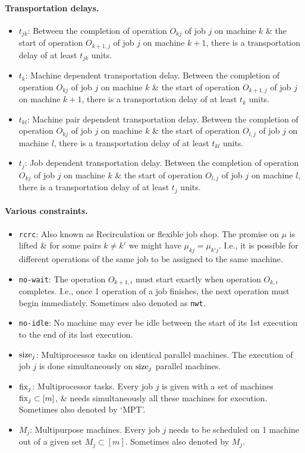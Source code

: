 \documentclass{article}
\begin{document}
\paragraph{Transportation delays.}

\begin{itemize}
	\item $t_{jk}$: Between the completion of operation $O_{kj}$ of job $j$ on machine $k$ \& the start of operation $O_{k+1,j}$ of job $j$ on machine $k + 1$, there is a transportation delay of at least $t_{jk}$ units.
	\item $t_k$: Machine dependent transportation delay. Between the completion of operation $O_{kj}$ of job $j$ on machine $k$ \& the start of operation $O_{k+1,j}$ of job $j$ on machine $k + 1$, there is a transportation delay of at least $t_k$ units.
	\item $t_{kl}$: Machine pair dependent transportation delay. Between the completion of operation $O_{kj}$ of job $j$ on machine $k$ \& the start of operation $O_{l,j}$ of job $j$ on machine $l$, there is a transportation delay of at least $t_{kl}$ units.
	\item $t_j$: Job dependent transportation delay. Between the completion of operation $O_{kj}$ of job $j$ on machine $k$ \& the start of operation $O_{l,j}$ of job $j$ on machine $l$, there is a transportation delay of at least $t_j$ units.
\end{itemize}

\paragraph{Various constraints.}

\begin{itemize}
	\item {\tt rcrc}: Also known as Recirculation or flexible job shop. The promise on $\mu$ is lifted \& for some pairs $k\ne k'$ we might have $\mu_{kj} = \mu_{k'j}$. I.e., it is possible for different operations of the same job to be assigned to the same machine.
	\item {\tt no-wait}: The operation $O_{k+1,i}$ must start exactly  when operation $O_{k,i}$ completes. I.e., once 1 operation of a job finishes, the next operation must begin immediately. Sometimes also denoted as {\tt nwt}.
	\item {\tt no-idle}: No machine may ever be idle between the start of its 1st execution to the end of its last execution.
	\item ${\rm size}_j$: Multiprocessor tasks on identical parallel machines. The execution of job $j$ is done simultaneously on ${\rm size}_j$ parallel machines.
	\item ${\rm fix}_j$: Multiprocessor tasks. Every job $j$ is given with a set of machines ${\rm fix}_j\subset[m]$, \& needs simultaneously all these machines for execution. Sometimes also denoted by `MPT'.
	\item $M_j$: Multipurpose machines. Every job $j$ needs to be scheduled on 1 machine out of a given set $M_j\subset[m]$. Sometimes also denoted by $M_j$.
\end{itemize}
\end{document}
